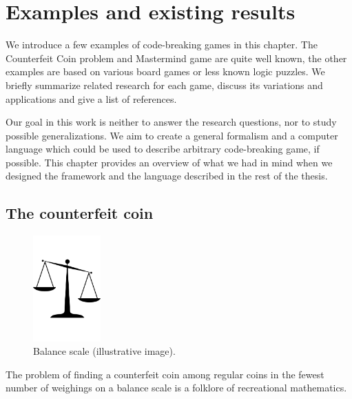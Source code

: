 \chapter{Examples and existing results}
\label{ch:games}
We introduce a few examples of code-breaking games in this chapter.
The Counterfeit Coin problem and Mastermind game are quite well known,
  the other examples are based on various board games or less known
  logic puzzles.
We briefly summarize related research for each game, discuss
  its variations and applications and give a list of
  references.

Our goal in this work is neither to answer the research questions, nor
  to study possible generalizations.
We aim to create a general formalism and a computer language which could
  be used to describe arbitrary code-breaking game, if possible.
This chapter provides an overview of what we had in mind
  when we designed the framework and the language described
  in the rest of the thesis.

\section{The counterfeit coin} \label{s:coins}

\begin{figure}
  \begin{center}
  \vspace{-5mm}
  \includegraphics[width=0.23\textwidth]{pictures/scales.pdf}
  \vspace{-5mm}
  \end{center}
  \caption{Balance scale (illustrative image)\protect\footnotemark.}
  \vspace{-10mm}
\end{figure}

The problem of finding a counterfeit coin among regular coins in the fewest
  number of weighings on a balance scale is a folklore of
  recreational mathematics.

